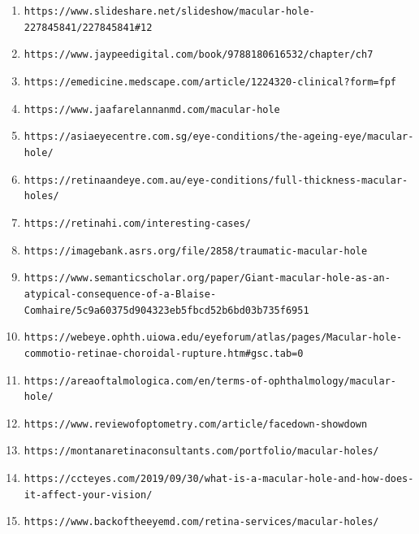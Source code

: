 \documentclass{article}
\begin{document}
\begin{enumerate}
			\item \nolinkurl{https://www.slideshare.net/slideshow/macular-hole-227845841/227845841#12}
			
			\item \nolinkurl{https://www.jaypeedigital.com/book/9788180616532/chapter/ch7}
			
			\item \nolinkurl{https://emedicine.medscape.com/article/1224320-clinical?form=fpf}
			
			\item \nolinkurl{https://www.jaafarelannanmd.com/macular-hole}
			
			\item \nolinkurl{https://asiaeyecentre.com.sg/eye-conditions/the-ageing-eye/macular-hole/}
			
			\item \nolinkurl{https://retinaandeye.com.au/eye-conditions/full-thickness-macular-holes/}
			
			\item \nolinkurl{https://retinahi.com/interesting-cases/}
			
			\item \nolinkurl{https://imagebank.asrs.org/file/2858/traumatic-macular-hole}
			
			\item \nolinkurl{https://www.semanticscholar.org/paper/Giant-macular-hole-as-an-atypical-consequence-of-a-Blaise-Comhaire/5c9a60375d904323eb5fbcd52b6bd03b735f6951}
			
			\item \nolinkurl{https://webeye.ophth.uiowa.edu/eyeforum/atlas/pages/Macular-hole-commotio-retinae-choroidal-rupture.htm#gsc.tab=0}
			
			
			\item \nolinkurl{https://areaoftalmologica.com/en/terms-of-ophthalmology/macular-hole/}
			
			\item \nolinkurl{https://www.reviewofoptometry.com/article/facedown-showdown}
			
			\item \nolinkurl{https://montanaretinaconsultants.com/portfolio/macular-holes/}
			
			\item \nolinkurl{https://ccteyes.com/2019/09/30/what-is-a-macular-hole-and-how-does-it-affect-your-vision/}
			
			\item \nolinkurl{https://www.backoftheeyemd.com/retina-services/macular-holes/}
			

\end{enumerate}
\end{document}
